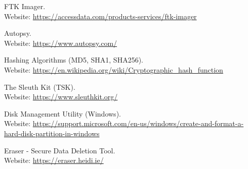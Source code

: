 \documentclass[11pt]{article}
\begin{document}
\clearpage
\begin{thebibliography}{99}
    FTK Imager. \\
    Website: \url{https://accessdata.com/products-services/ftk-imager}

    Autopsy. \\
    Website: \url{https://www.autopsy.com/}

    Hashing Algorithms (MD5, SHA1, SHA256). \\
    Website: \url{https://en.wikipedia.org/wiki/Cryptographic_hash_function}

    The Sleuth Kit (TSK). \\
    Website: \url{https://www.sleuthkit.org/}

    Disk Management Utility (Windows). \\
    Website: \url{https://support.microsoft.com/en-us/windows/create-and-format-a-hard-disk-partition-in-windows}

    Eraser - Secure Data Deletion Tool. \\
    Website: \url{https://eraser.heidi.ie/}
\end{thebibliography}
\end{document}
